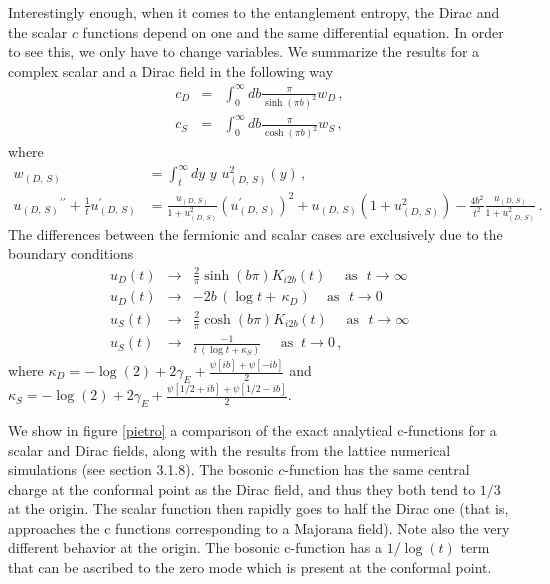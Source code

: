 \documentclass[11pt]{article}
\begin{document}
Interestingly enough, when it comes to the entanglement entropy, the Dirac and the scalar $c$ functions depend on one and the same differential equation. In order to see this, we only have to change variables. We summarize the results for a complex scalar and a Dirac field in the following way 
\begin{eqnarray}
c_D&=&\int_0^{\infty}db \frac{\pi}{\sinh(\pi b)^2}w_{D}\,,\\
c_S&=&\int_0^{\infty}db \frac{\pi}{\cosh(\pi b)^2}w_{S}\,,
\end{eqnarray}
where
\begin{align}
w_{(D,\,S)}&=\int_{t}^{\infty}dy\,\,y\,\,u_{(D,\,S)}^{2}(y)  \,,\\
u_{(D,\,S)}{^{\prime \prime }}+\frac{1}{t}u_{(D,\,S)}^{\prime} &=\frac{
u_{(D,\,S)}}{1+u_{(D,\,S)}^{2}}\left( u_{(D,\,S)}^{\prime}\right)
^{2}+u_{(D,\,S)}\left( 1+u_{(D,\,S)}^{2}\right) -\frac{4b^{2}}{t^{2}}\frac{u_{(D,\,S)}}{1+u_{(D,\,S)}^{2}}\,. 
\end{align}
The differences between the fermionic and scalar cases are exclusively due to the boundary conditions 
\begin{eqnarray}
u_D(t) &\rightarrow &\frac{2}{\pi} \sinh (b \pi) K_{i 2 b} (t)\,\,\,\,\,\,\,\, \textrm{as} \,\,\,\, t\rightarrow \infty \,\\
u_{D}(t)&\rightarrow& -2 b \,(\log t+\,\kappa_{D})\,\,\,\,\,\,\,\textrm{as}\,\,\,\,t\rightarrow 0 \\
u_{S}(t)&\rightarrow &\frac{2}{\pi} \cosh (b \pi) K_{i 2 b} (t)\,\,\,\,\,\,\,\, \textrm{as} \,\,\,\, t\rightarrow \infty \\
u_{S}(t) &\rightarrow & \frac{-1}{t \,(\log t+\kappa_S)}\;\;\;\;\;\textrm{as}\;\;t\to 0\,,
\end{eqnarray}
where $\kappa_D=-\log(2)+2\gamma_E+\frac{\psi[ib]+\psi[-ib]}{2}$ and $\kappa_S=-\log(2)+2\gamma_E+\frac{\psi[1/2+ib]+\psi[1/2-ib]}{2}$.

We show in figure \ref{pietro} a comparison of the exact analytical c-functions for a scalar and Dirac fields, along with the results from the lattice numerical simulations (see section 3.1.8). The bosonic $c$-function has the same central charge at the conformal point as the Dirac field, and thus they both tend to $1/3$ at the origin. The scalar function then rapidly goes to half the Dirac one (that is, approaches the c functions corresponding to a Majorana field). Note also the very different behavior at the origin. The bosonic c-function has a $1/\log (t)$ term that can be ascribed to the zero mode which is present at the conformal point.
\end{document}
